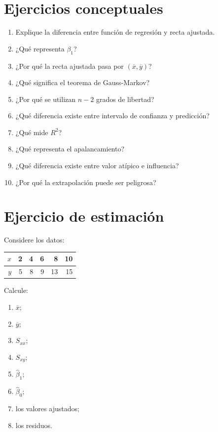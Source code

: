 \documentclass[
  spanish,
  11pt,
  letterpaper,
  DIV=11,
  numbers=noendperiod]{scrreprt}
\newcounter{none} %
\providecommand{\tightlist}{%
  \setlength{\itemsep}{0pt}\setlength{\parskip}{0pt}}
\theoremstyle{definition}
\theoremstyle{plain}
\theoremstyle{definition}
\theoremstyle{remark}
\begin{document}
\section{Ejercicios conceptuales}\label{ejercicios-conceptuales-8}

\begin{enumerate}
\def\labelenumi{\arabic{enumi}.}
\tightlist
\item
  Explique la diferencia entre función de regresión y recta ajustada.
\item
  ¿Qué representa \(\beta_1\)?
\item
  ¿Por qué la recta ajustada pasa por \((\overline{x},\overline{y})\)?
\item
  ¿Qué significa el teorema de Gauss-Markov?
\item
  ¿Por qué se utilizan \(n-2\) grados de libertad?
\item
  ¿Qué diferencia existe entre intervalo de confianza y predicción?
\item
  ¿Qué mide \(R^2\)?
\item
  ¿Qué representa el apalancamiento?
\item
  ¿Qué diferencia existe entre valor atípico e influencia?
\item
  ¿Por qué la extrapolación puede ser peligrosa?
\end{enumerate}

\section{Ejercicio de estimación}\label{ejercicio-de-estimaciuxf3n}

Considere los datos:

{\def\LTcaptype{none} %
\begin{longtable}[]{@{}rrrrrr@{}}
\toprule\noalign{}
\(x\) & 2 & 4 & 6 & 8 & 10 \\
\midrule\noalign{}
\endhead
\bottomrule\noalign{}
\endlastfoot
\(y\) & 5 & 8 & 9 & 13 & 15 \\
\end{longtable}
}

Calcule:

\begin{enumerate}
\def\labelenumi{\arabic{enumi}.}
\tightlist
\item
  \(\overline{x}\);
\item
  \(\overline{y}\);
\item
  \(S_{xx}\);
\item
  \(S_{xy}\);
\item
  \(\widehat{\beta}_1\);
\item
  \(\widehat{\beta}_0\);
\item
  los valores ajustados;
\item
  los residuos.
\end{enumerate}
\end{document}
